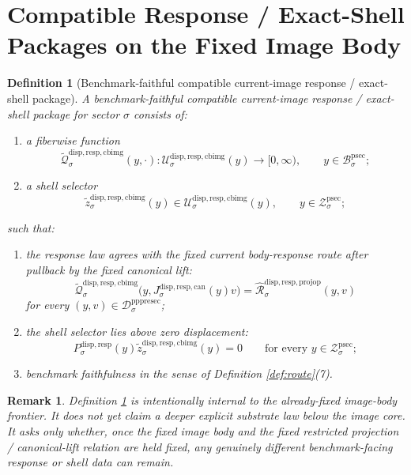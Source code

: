 \documentclass[11pt]{article}
\newcommand{\ProtoSectionBody}[1]{\mathcal B_{#1}^{\mathrm{psec}}}
\newcommand{\ProtoSectionShell}[1]{\mathcal Z_{#1}^{\mathrm{psec}}}
\newcommand{\PrePreProtoSectionResidualBody}[1]{\mathcal D_{#1}^{\mathrm{pppresec}}}
\newcommand{\SubstrateProjection}[1]{P_{#1}^{\mathrm{disp,resp}}}
\newcommand{\CanonicalLift}[1]{J_{#1}^{\mathrm{disp,resp,can}}}
\newcommand{\CoreForcedBodyResponse}[1]{\widehat{\mathscr R}_{#1}^{\mathrm{disp,resp,projop}}}
\newcommand{\CanonicalImageBody}[1]{\mathcal U_{#1}^{\mathrm{disp,resp,cbimg}}}
\newcommand{\CompatibleImageResponseLaw}[1]{\widetilde{\mathscr Q}_{#1}^{\mathrm{disp,resp,cbimg}}}
\newcommand{\CompatibleShellSection}[1]{\widetilde z_{#1}^{\mathrm{disp,resp,cbimg}}}
\newtheorem{definition}{Definition}
\newtheorem{remark}{Remark}
\begin{document}
\section{Compatible Response / Exact-Shell Packages on the Fixed Image Body}

\begin{definition}[Benchmark-faithful compatible current-image response / exact-shell package]
\label{def:compatible}
A \emph{benchmark-faithful compatible current-image response / exact-shell package} for sector \(\sigma\) consists of:
\begin{enumerate}
    \item a fiberwise function
    \[
    \CompatibleImageResponseLaw{\sigma}(y,\cdot):
    \CanonicalImageBody{\sigma}(y)\to[0,\infty),
    \qquad
    y\in\ProtoSectionBody{\sigma};
    \]
    \item a shell selector
    \[
    \CompatibleShellSection{\sigma}(y)\in\CanonicalImageBody{\sigma}(y),
    \qquad
    y\in\ProtoSectionShell{\sigma};
    \]
\end{enumerate}
such that:
\begin{enumerate}[label=(\arabic*)]
    \item the response law agrees with the fixed current body-response route after pullback by the fixed canonical lift:
    \[
    \CompatibleImageResponseLaw{\sigma}\bigl(y,\CanonicalLift{\sigma}(y)v\bigr)
    =
    \CoreForcedBodyResponse{\sigma}(y,v)
    \]
    for every \((y,v)\in\PrePreProtoSectionResidualBody{\sigma}\);
    \item the shell selector lies above zero displacement:
    \[
    \SubstrateProjection{\sigma}(y)\CompatibleShellSection{\sigma}(y)=0
    \qquad
    \text{for every }
    y\in\ProtoSectionShell{\sigma};
    \]
    \item benchmark faithfulness in the sense of Definition \ref{def:route}(7).
\end{enumerate}
\end{definition}

\begin{remark}
Definition \ref{def:compatible} is intentionally internal to the already-fixed image-body frontier. It does not yet claim a deeper explicit substrate law below the image core. It asks only whether, once the fixed image body and the fixed restricted projection / canonical-lift relation are held fixed, any genuinely different benchmark-facing response or shell data can remain.
\end{remark}
\end{document}
